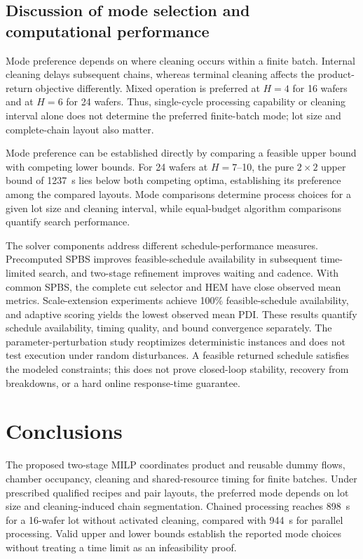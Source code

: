 \documentclass[journal]{IEEEtran}
\newcounter{algorithm}
\begin{document}
\subsection{Discussion of mode selection and computational performance}

Mode preference depends on where cleaning occurs within a finite batch. Internal cleaning delays subsequent chains, whereas terminal cleaning affects the product-return objective differently. Mixed operation is preferred at $H=4$ for 16 wafers and at $H=6$ for 24 wafers. Thus, single-cycle processing capability or cleaning interval alone does not determine the preferred finite-batch mode; lot size and complete-chain layout also matter.

Mode preference can be established directly by comparing a feasible upper bound with competing lower bounds. For 24 wafers at $H=7$--10, the pure $2\times2$ upper bound of 1237~s lies below both competing optima, establishing its preference among the compared layouts. Mode comparisons determine process choices for a given lot size and cleaning interval, while equal-budget algorithm comparisons quantify search performance.

The solver components address different schedule-performance measures. Precomputed SPBS improves feasible-schedule availability in subsequent time-limited search, and two-stage refinement improves waiting and cadence. With common SPBS, the complete cut selector and HEM have close observed mean metrics. Scale-extension experiments achieve 100\% feasible-schedule availability, and adaptive scoring yields the lowest observed mean PDI. These results quantify schedule availability, timing quality, and bound convergence separately. The parameter-perturbation study reoptimizes deterministic instances and does not test execution under random disturbances. A feasible returned schedule satisfies the modeled constraints; this does not prove closed-loop stability, recovery from breakdowns, or a hard online response-time guarantee.

\section{Conclusions}
The proposed two-stage MILP coordinates product and reusable dummy flows, chamber occupancy, cleaning and shared-resource timing for finite batches. Under prescribed qualified recipes and pair layouts, the preferred mode depends on lot size and cleaning-induced chain segmentation. Chained processing reaches 898~s for a 16-wafer lot without activated cleaning, compared with 944~s for parallel processing. Valid upper and lower bounds establish the reported mode choices without treating a time limit as an infeasibility proof.
\end{document}
